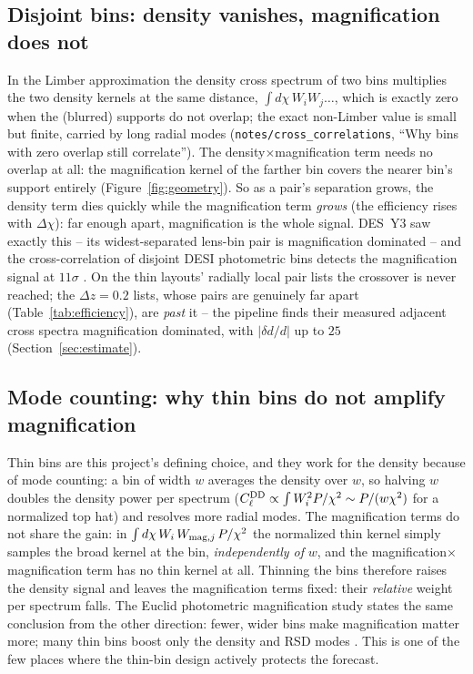 \documentclass[11pt]{article}
\newcommand{\us}{\_\allowbreak}
\begin{document}
\subsection{Disjoint bins: density vanishes, magnification does not}
\label{sec:disjoint}

In the Limber approximation the density cross spectrum of two bins
multiplies the two density kernels at the same distance,
$\int d\chi\, W_i W_j \ldots$, which is exactly zero when the
(blurred) supports do not overlap; the exact non-Limber value is
small but finite, carried by long radial modes
(\texttt{notes/cross\us correlations}, ``Why bins with zero overlap
still correlate'').  The density$\times$magnification term needs no
overlap at all: the magnification kernel of the farther bin covers
the nearer bin's support entirely
(Figure~\ref{fig:geometry}).  So as a pair's separation grows, the
density term dies quickly while the magnification term \emph{grows}
(the efficiency rises with $\Delta\chi$): far enough apart,
magnification is the whole signal.  DES~Y3 saw exactly this -- its
widest-separated lens-bin pair is magnification dominated
\cite{ElvinPoole2022} -- and the cross-correlation of disjoint DESI
photometric bins detects the magnification signal at $11\sigma$
\cite{Sailer2025}.  On the thin layouts' radially local pair lists
the crossover is never reached; the $\Delta z = 0.2$ lists, whose
pairs are genuinely far apart (Table~\ref{tab:efficiency}), are
\emph{past} it -- the pipeline finds their measured adjacent cross
spectra magnification dominated, with $|\delta d / d|$ up to $25$
(Section~\ref{sec:estimate}).

\subsection{Mode counting: why thin bins do not amplify magnification}
\label{sec:modes}

Thin bins are this project's defining choice, and they work for the
density because of mode counting: a bin of width $w$ averages the
density over $w$, so halving $w$ doubles the density power per
spectrum ($C_\ell^{\rm DD} \propto \int W_i^2 P/\chi^2 \sim P/(w
\chi^2)$ for a normalized top hat) and resolves more radial modes.
The magnification terms do not share the gain: in
$\int d\chi\, W_i\, W_{{\rm mag},j}\, P/\chi^2$ the normalized thin
kernel simply samples the broad kernel at the bin,
\emph{independently of} $w$, and the
magnification$\times$magnification term has no thin kernel at all.
Thinning the bins therefore raises the density signal and leaves the
magnification terms fixed: their \emph{relative} weight per spectrum
falls.  The Euclid photometric magnification study states the same
conclusion from the other direction: fewer, wider bins make
magnification matter more; many thin bins boost only the density and
RSD modes \cite{LeporiEuclid}.  This is one of the few places where
the thin-bin design actively protects the forecast.
\end{document}
